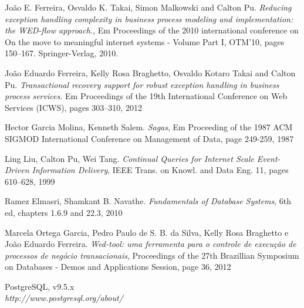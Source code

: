 \documentclass[conference]{IEEEtran}
\begin{document}

%
%
%
\begin{thebibliography}{1}

João E. Ferreira, Osvaldo K. Takai, Simon Malkowski and Calton Pu. 
\emph{Reducing exception handling complexity in business process modeling and implementation:
the WED-flow approach.}, Em Proceedings of the 2010 international conference on
On the move to meaningful internet systems - Volume Part I, OTM’10, pages
150–167. Springer-Verlag, 2010.

João Eduardo Ferreira, Kelly Rosa Braghetto, Osvaldo Kotaro Takai and
Calton Pu.\emph{ Transactional recovery support for robust exception handling in business process
services.} Em Proceedings of the 19th International Conference on Web Services (ICWS), pages
303–310, 2012

Hector Garcia Molina, Kenneth Salem.
\emph{Sagas}, Em Proceeding of the 1987 ACM SIGMOD International Conference on Management of Data, page 249-259, 1987

Ling Liu, Calton Pu, Wei Tang.
\emph{Continual Queries for Internet Scale Event-Driven Information Delivery},
IEEE Trans. on Knowl. and Data Eng. 11, pages 610–628, 1999

Ramez Elmasri, Shamkant B. Navathe.
\emph{Fundamentals of Database Systems}, 6th ed, chapters 1.6.9 and 22.3, 2010

Marcela Ortega Garcia, Pedro Paulo de S. B. da Silva, Kelly Rosa Braghetto e João Eduardo Ferreira.
\emph{Wed-tool: uma ferramenta para o controle de execução de processos de negócio transacionais},
Proceedings of the 27th Brazillian Symposium on Databases - Demos and Applications Session, page 36, 2012

PostgreSQL, v9.5.x \\
\emph{http://www.postgresql.org/about/}

\end{thebibliography}
\end{document}
